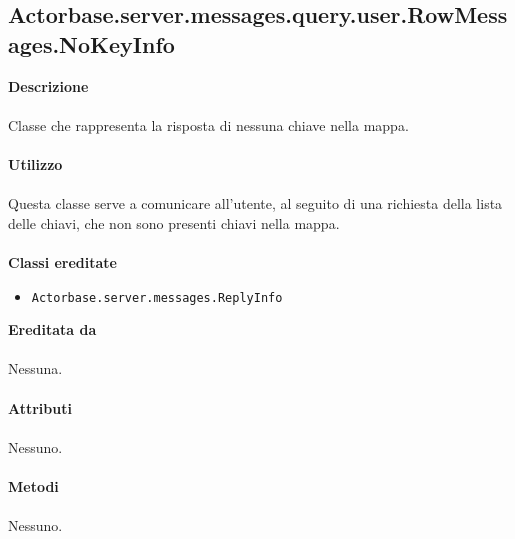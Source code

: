 \documentclass[a4paper]{article}
\begin{document}
	\subsection{Actorbase.server.messages.query.user.RowMessages.NoKeyInfo}
		\textbf{Descrizione}
			\\ \\
		Classe che rappresenta la risposta di nessuna chiave nella mappa.
			\\ \\
		\textbf{Utilizzo}
			\\ \\
		Questa classe serve a comunicare all'utente, al seguito di una richiesta della lista delle chiavi, che non sono presenti chiavi nella mappa.
			\\ \\
		\textbf{Classi ereditate}
			\begin{itemize}
				\item \texttt{Actorbase.server.messages.ReplyInfo }
			\end{itemize}
		\textbf{Ereditata da}
			\\ \\
			Nessuna.
			\\ \\
		\textbf{Attributi}
			\\ \\
			Nessuno.
			\\ \\
		\textbf{Metodi }
			\\ \\
			Nessuno.
	
\end{document}
